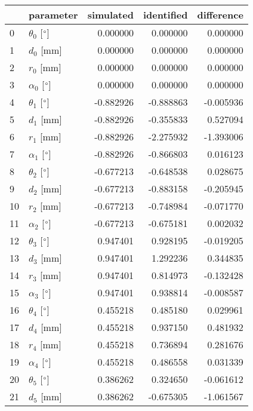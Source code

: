 \documentclass{standalone}%
\begin{document}
%
\normalsize%
\begin{tabular}{llrrr}
\toprule
{} &                 parameter & simulated & identified & difference \\
\midrule
0  &  $\theta_{0}$ [$\degree$] &  0.000000 &   0.000000 &   0.000000 \\
1  &              $d_{0}$ [mm] &  0.000000 &   0.000000 &   0.000000 \\
2  &              $r_{0}$ [mm] &  0.000000 &   0.000000 &   0.000000 \\
3  &  $\alpha_{0}$ [$\degree$] &  0.000000 &   0.000000 &   0.000000 \\
4  &  $\theta_{1}$ [$\degree$] & -0.882926 &  -0.888863 &  -0.005936 \\
5  &              $d_{1}$ [mm] & -0.882926 &  -0.355833 &   0.527094 \\
6  &              $r_{1}$ [mm] & -0.882926 &  -2.275932 &  -1.393006 \\
7  &  $\alpha_{1}$ [$\degree$] & -0.882926 &  -0.866803 &   0.016123 \\
8  &  $\theta_{2}$ [$\degree$] & -0.677213 &  -0.648538 &   0.028675 \\
9  &              $d_{2}$ [mm] & -0.677213 &  -0.883158 &  -0.205945 \\
10 &              $r_{2}$ [mm] & -0.677213 &  -0.748984 &  -0.071770 \\
11 &  $\alpha_{2}$ [$\degree$] & -0.677213 &  -0.675181 &   0.002032 \\
12 &  $\theta_{3}$ [$\degree$] &  0.947401 &   0.928195 &  -0.019205 \\
13 &              $d_{3}$ [mm] &  0.947401 &   1.292236 &   0.344835 \\
14 &              $r_{3}$ [mm] &  0.947401 &   0.814973 &  -0.132428 \\
15 &  $\alpha_{3}$ [$\degree$] &  0.947401 &   0.938814 &  -0.008587 \\
16 &  $\theta_{4}$ [$\degree$] &  0.455218 &   0.485180 &   0.029961 \\
17 &              $d_{4}$ [mm] &  0.455218 &   0.937150 &   0.481932 \\
18 &              $r_{4}$ [mm] &  0.455218 &   0.736894 &   0.281676 \\
19 &  $\alpha_{4}$ [$\degree$] &  0.455218 &   0.486558 &   0.031339 \\
20 &  $\theta_{5}$ [$\degree$] &  0.386262 &   0.324650 &  -0.061612 \\
21 &              $d_{5}$ [mm] &  0.386262 &  -0.675305 &  -1.061567 \\

\end{tabular}
\end{document}
